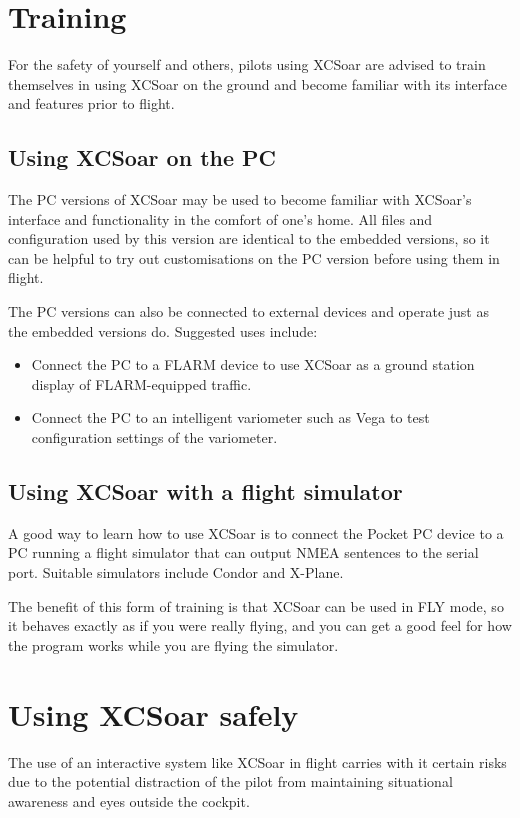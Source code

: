 \section{Training}
For the safety of yourself and others, pilots using XCSoar are advised to
train themselves in using XCSoar on the ground and become familiar with its
interface and features prior to flight.

\subsection*{Using XCSoar on the PC}
The PC versions of XCSoar may be used to become familiar with XCSoar's
interface and functionality in the comfort of one's home.  All files
and configuration used by this version are identical to the embedded versions,
so it can be helpful to try out customisations on the PC version before using
them in flight.

The PC versions can also be connected to external devices and operate just as
the embedded versions do. Suggested uses include:
\begin{itemize}
\item Connect the PC to a FLARM device to use XCSoar as a ground
station display of FLARM-equipped traffic.
\item Connect the PC to an intelligent variometer such as Vega to
test configuration settings of the variometer.
\end{itemize}

\subsection*{Using XCSoar with a flight simulator}
A good way to learn how to use XCSoar is to connect the Pocket PC
device to a PC running a flight simulator that can output NMEA
sentences to the serial port. Suitable simulators include Condor and
X-Plane.  

The benefit of this form of training is that XCSoar can be used in FLY
mode, so it behaves exactly as if you were really flying, and you can
get a good feel for how the program works while you are flying the
simulator.

\section{Using XCSoar safely}
The use of an interactive system like XCSoar in flight carries with it
certain risks due to the potential distraction of the pilot from
maintaining situational awareness and eyes outside the cockpit.

